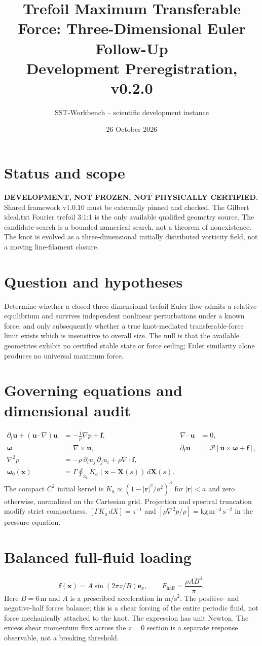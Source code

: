 \documentclass[11pt,a4paper]{article}
\title{Trefoil Maximum Transferable Force: Three-Dimensional Euler Follow-Up\\Development Preregistration, v0.2.0}
\author{SST-Workbench -- scientific development instance}
\date{26 October 2026}
\begin{document}
\maketitle
\section{Status and scope}
\textbf{DEVELOPMENT, NOT FROZEN, NOT PHYSICALLY CERTIFIED.} Shared framework v1.0.10 must be externally pinned and checked. The Gilbert ideal.txt Fourier trefoil 3:1:1 is the only available qualified geometry source. The candidate search is a bounded numerical search, not a theorem of nonexistence. The knot is evolved as a three-dimensional initially distributed vorticity field, not a moving line-filament closure.
\section{Question and hypotheses}
Determine whether a closed three-dimensional trefoil Euler flow admits a relative equilibrium and survives independent nonlinear perturbations under a known force, and only subsequently whether a true knot-mediated transferable-force limit exists which is insensitive to overall size. The null is that the available geometries exhibit no certified stable state or force ceiling; Euler similarity alone produces no universal maximum force.
\section{Governing equations and dimensional audit}
\begin{align}
\partial_t\mathbf u+(\mathbf u\cdot\nabla)\mathbf u&=-\frac{1}{\rho}\nabla p+\mathbf f,&\nabla\cdot\mathbf u&=0,\\
\boldsymbol\omega&=\nabla\times\mathbf u,&
\partial_t\mathbf u&=\mathcal P[\mathbf u\times\boldsymbol\omega+\mathbf f],\\
\nabla^2p&=-\rho\,\partial_i u_j\,\partial_j u_i+\rho\nabla\cdot\mathbf f,\\
\boldsymbol\omega_0(\mathbf x)&=\Gamma\oint_{3_1}K_a(\mathbf x-\mathbf X(s))\,d\mathbf X(s).
\end{align}
The compact $C^2$ initial kernel is $K_a\propto(1-|\mathbf r|^2/a^2)^3$ for $|\mathbf r|<a$ and zero otherwise, normalized on the Cartesian grid. Projection and spectral truncation modify strict compactness. $[\Gamma K_a\,dX]=\mathrm{s}^{-1}$ and $[\rho\nabla^2p/\rho]=\mathrm{kg\,m^{-3}\,s^{-2}}$ in the pressure equation.
\section{Balanced full-fluid loading}
\begin{equation}
\mathbf f(\mathbf x)=A\sin(2\pi z/B)\mathbf e_x,\qquad F_{\mathrm{half}}=\frac{\rho A B^3}{\pi}.
\end{equation}
Here $B=6\,\mathrm{m}$ and $A$ is a prescribed acceleration in $\mathrm{m/s^2}$. The positive- and negative-half forces balance; this is a shear forcing of the entire periodic fluid, not force mechanically attached to the knot. The expression has unit Newton. The excess shear momentum flux across the $z=0$ section is a separate response observable, not a breaking threshold.
\end{document}
